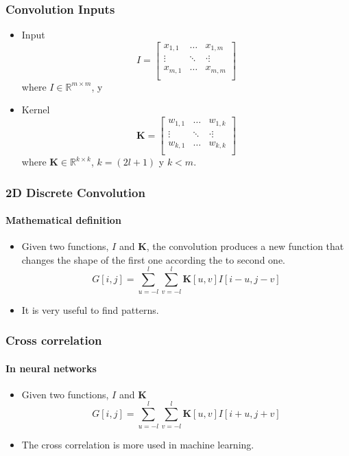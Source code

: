 \documentclass[aspectratio=169]{beamer}
\begin{document}
\begin{frame}
	\frametitle{Convolution Inputs}
	\begin{itemize}
		\item Input
		\begin{equation}
			I = \left[ \begin{matrix}
				x_{1,1} & \dots & x_{1,m} \\
				\vdots & \ddots & ·\vdots \\
				x_{m,1} & \dots & x_{m,m} \\
			\end{matrix} \right]
		\end{equation} where $I\in \mathbb{R}^{m\times m}$, y
		\item Kernel
		\begin{equation}
			\textbf{K} = \left[ \begin{matrix}
				w_{1,1} & \dots & w_{1,k} \\
				\vdots & \ddots & ·\vdots \\
				w_{k,1} & \dots & w_{k,k} \\
			\end{matrix} \right]
		\end{equation} where $\textbf{K}\in \mathbb{R}^{k\times k}$, $k = (2l+1)$ y $k < m$. 
	\end{itemize}
\end{frame}


\begin{frame}
\frametitle{2D Discrete Convolution}
\framesubtitle{Mathematical definition}

\begin{itemize}
	\item Given two functions, $I$ and $\textbf{K}$, the convolution produces a new function that changes the shape of the first one according the to second one. 
	\begin{equation}
	G[i,j] =  \sum_{u=-l}^{l} \sum_{v=-l}^{l} \textbf{K}[u,v] I[i-u,j-v]
	\end{equation}
	\item It is very useful to find patterns.
\end{itemize}
\end{frame}


\begin{frame}
	\frametitle{Cross correlation}
	\framesubtitle{In neural networks}
	\begin{itemize}
		\item Given two functions, $I$ and $\textbf{K}$
		\begin{equation}
			G[i,j] =  \sum_{u=-l}^{l} \sum_{v=-l}^{l} \textbf{K}[u,v] I[i+u,j+v]
		\end{equation}
		\item The cross correlation is more used in machine learning.
	\end{itemize}
\end{frame}
\end{document}
